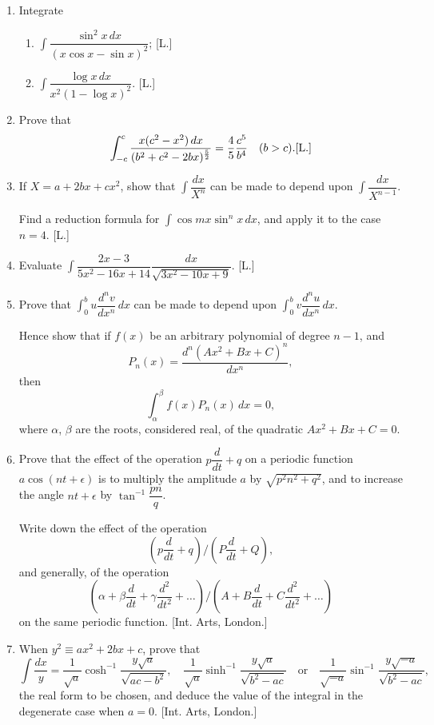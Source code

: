 \documentclass[11pt, a4paper]{article}
\newcommand{\source}[1]{\hfill\textnormal{[#1]}}
\begin{document}
\begin{enumerate}[leftmargin=2em]

\item Integrate
\begin{enumerate}[label=(\roman*)]
\item $\displaystyle\int \dfrac{\sin^2x\,dx}{(x\cos x-\sin x)^2}$; \source{L.}
\item $\displaystyle\int \dfrac{\log x\,dx}{x^2(1-\log x)^2}$. \source{L.}
\end{enumerate}

\item Prove that
\[
\int_{-c}^{c} \dfrac{x(c^2-x^2)\,dx}{(b^2+c^2-2bx)^{\frac52}}=\dfrac45\dfrac{c^5}{b^4} \quad (b>c). \source{L.}
\]

\item If $X=a+2bx+cx^2$, show that $\displaystyle\int \dfrac{dx}{X^n}$ can be made to depend upon $\displaystyle\int \dfrac{dx}{X^{n-1}}$.

Find a reduction formula for $\displaystyle\int \cos mx\sin^nx\,dx$, and apply it to the case $n=4$. \source{L.}

\item Evaluate $\displaystyle\int \dfrac{2x-3}{5x^2-16x+14}\dfrac{dx}{\sqrt{3x^2-10x+9}}$. \source{L.}

\item Prove that $\displaystyle\int_0^b u\dfrac{d^nv}{dx^n}\,dx$ can be made to depend upon $\displaystyle\int_0^b v\dfrac{d^nu}{dx^n}\,dx$.

Hence show that if $f(x)$ be an arbitrary polynomial of degree $n-1$, and
\[
P_n(x)=\dfrac{d^n(Ax^2+Bx+C)^n}{dx^n},
\]
then
\[
\int_\alpha^\beta f(x)P_n(x)\,dx=0,
\]
where $\alpha$, $\beta$ are the roots, considered real, of the quadratic $Ax^2+Bx+C=0$.

\item Prove that the effect of the operation $p\dfrac{d}{dt}+q$ on a periodic function $a\cos(nt+\epsilon)$ is to multiply the amplitude $a$ by $\sqrt{p^2n^2+q^2}$, and to increase the angle $nt+\epsilon$ by $\tan^{-1}\dfrac{pn}{q}$.

Write down the effect of the operation
\[
\left(p\dfrac{d}{dt}+q\right)\Big/\left(P\dfrac{d}{dt}+Q\right),
\]
and generally, of the operation
\[
\left(\alpha+\beta\dfrac{d}{dt}+\gamma\dfrac{d^2}{dt^2}+\dots\right)\Big/\left(A+B\dfrac{d}{dt}+C\dfrac{d^2}{dt^2}+\dots\right)
\]
on the same periodic function. \source{Int. Arts, London.}

\item When $y^2\equiv ax^2+2bx+c$, prove that
\[
\int \dfrac{dx}{y}=\dfrac{1}{\sqrt a}\cosh^{-1}\dfrac{y\sqrt a}{\sqrt{ac-b^2}}, \quad \dfrac{1}{\sqrt a}\sinh^{-1}\dfrac{y\sqrt a}{\sqrt{b^2-ac}} \quad\text{or}\quad \dfrac{1}{\sqrt{-a}}\sin^{-1}\dfrac{y\sqrt{-a}}{\sqrt{b^2-ac}},
\]
the real form to be chosen, and deduce the value of the integral in the degenerate case when $a=0$. \source{Int. Arts, London.}


\end{enumerate}
\end{document}
